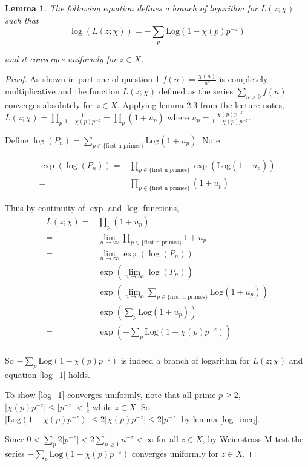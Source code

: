 \documentclass{article}
\newtheorem{lemma}[theorem]{Lemma}
\theoremstyle{definition}
\theoremstyle{definition}
\theoremstyle{remark}
\newcommand{\Log}{\text{Log}}
\begin{document}
\begin{lemma}\label{lm:log_to_Log}
The following equation defines a branch of logarithm for $L(z; \chi)$ such that 
\begin{equation}\label{log_1}
	\log(L(z; \chi)) = - \sum_p \Log(1-\chi(p)p^{-z})
\end{equation}

and it converges uniformly for $z \in X$.

\end{lemma}

\begin{proof}
	As shown in part one of question 1 $f(n) = \frac{\chi(n)}{n^{z}}$ is completely multiplicative and the function $L(z; \chi)$ defined as the series $\sum_{n >0} f(n)$ converges absolutely for $z \in X$. 
	Applying lemma 2.3 from the lecture notes, $L(z; \chi) = \prod_{p} \frac{1}{1- \chi(p)p^{-z}} = \prod_p (1 + u_p)$ where $u_p = \frac{\chi(p)p^{-z}}{1 - \chi(p) p ^{-z}}$.

	Define $\log(P_n) = \sum_{p \in \{\text{first n primes}\}} \Log(1 + u_p)$. 
	Note 
	
	\begin{align*}
		\exp(\log(P_n))
		=& \prod_{ {p \in \{\text{first n primes}\}}} \exp(\Log (1+ u_p))\\
		=& \prod_{ {p \in \{\text{first n primes}\}}}  (1+ u_p)
	\end{align*}

	Thus by continuity of $\exp$ and $\log$ functions, 
	\begin{align*}
		L(z; \chi) 
		= & \prod_{p} (1 + u_p) \\
		=& \lim_{n \rightarrow \infty} \prod_{ p \in \{\text{first n primes}\} } 1 + u_p \\
		=& \lim_{n \rightarrow \infty} \exp(\log(P_n)) \\
		=& \exp(\lim_{n \rightarrow \infty} \log(P_n)) \\
		=& \exp(\lim_{n \rightarrow \infty} \sum_{p \in \{\text{first n primes}\}} \Log(1 + u_p)) \\
		=& \exp(\sum_{p} \Log(1 + u_p)) \\
		=& \exp( - \sum_{p} \Log(1 - \chi(p)p^{-z})) \\
	\end{align*}

	So $- \sum_{p} \Log(1 - \chi(p)p^{-z})$ is indeed a branch of logarithm for $L(z; \chi)$ and equation \ref{log_1} holds.

	To show \ref{log_1} converges uniformly, note that all prime $p \geq 2$, $|\chi(p) p^{-z}| \leq | p^{-z}| < \frac{1}{2}$ while $z \in X$.
	So $|\Log(1- \chi(p)p^{-z})| \leq 2|\chi(p)p^{-z}| \leq 2 |p^{-z}| $ by lemma \ref{log_ineq}.
	
	Since $0 < \sum_{p} 2|p^{-z}| < 2\sum_{n \geq 1} n^{-z} < \infty$ for all $z \in X$, by Weierstrass M-test the series $-\sum_{p} \Log(1-\chi(p)p^{-z})$ converges uniformly for $z \in X$.
\end{proof}
\end{document}
